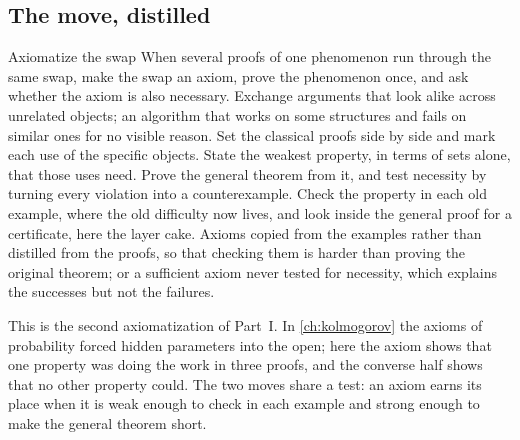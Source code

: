 \begin{refsection}
\section{The move, distilled}\label{sec:matroid:distilled}

\begin{move}{Axiomatize the swap}
 When several proofs of one phenomenon run through the same swap, make the swap an axiom, prove the phenomenon once, and ask whether the axiom is also necessary.
 Exchange arguments that look alike across unrelated objects; an algorithm that works on some structures and fails on similar ones for no visible reason.
 Set the classical proofs side by side and mark each use of the specific objects. State the weakest property, in terms of sets alone, that those uses need. Prove the general theorem from it, and test necessity by turning every violation into a counterexample. Check the property in each old example, where the old difficulty now lives, and look inside the general proof for a certificate, here the layer cake.
 Axioms copied from the examples rather than distilled from the proofs, so that checking them is harder than proving the original theorem; or a sufficient axiom never tested for necessity, which explains the successes but not the failures.
\end{move}


This is the second axiomatization of Part~I. In \cref{ch:kolmogorov} the axioms of probability forced hidden parameters into the open; here the axiom shows that one property was doing the work in three proofs, and the converse half shows that no other property could. The two moves share a test: an axiom earns its place when it is weak enough to check in each example and strong enough to make the general theorem short.


\end{refsection}
